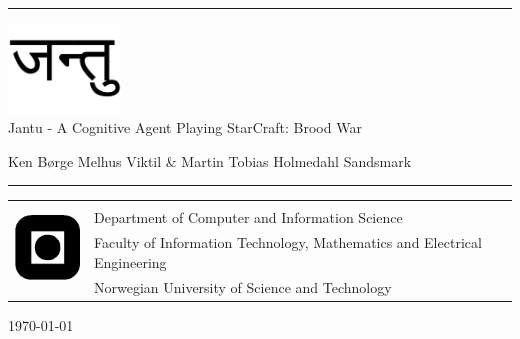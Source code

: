 \documentclass[a4paper, twoside, openright, 12pt]{report}
\title{\papertitle}
\author{\authors}
\def \authors {Ken B\o{}rge Melhus Viktil \& Martin Tobias Holmedahl Sandsmark}
\def \papertitle {Jantu - A Cognitive Agent Playing StarCraft: Brood War}
\begin{document}
\begin{titlepage}
\begin{center}

\vspace*{5cm}
\hrule height 1pt
\includegraphics[width=30mm]{graphics/jantu.pdf}\\
\huge{\papertitle}

\vspace{.5cm}
\large{\authors}
\vspace{.5cm}
\hrule height 1pt

\vspace{6cm}
\end{center}
\normalsize
\begin{table}[!h]
\begin{tabular}{ll}
\multirow{4}{*}{\includegraphics[width=20mm]{graphics/logo.png}} & \\
& Department of Computer and Information Science \\
& Faculty of Information Technology, Mathematics and Electrical Engineering \\
& Norwegian University of Science and Technology \\
\end{tabular}
\end{table}
\vspace{.5cm}
\begin{center}
\today
\end{center}
\end{titlepage}

\thispagestyle{empty}
\cleardoublepage

\begin{abstract}
We present our work in implementing a cognitive agent that plays the real-time strategy game StarCraft: Brood War.

First we present the game itself, with a focus on the mechanics pertaining to the design of agents that plays it. Then we present the Global Workspace Theory, as well as a review of agent architectures based on it, and also a detailed description of both the LIDA cognitive model and the LIDA framework that aims to implement the LIDA model.

Finally we present our work on implementing an agent that plays StarCraft: Brood War with the LIDA software framework.
\end{abstract}
\thispagestyle{empty}
\cleardoublepage
\end{document}
